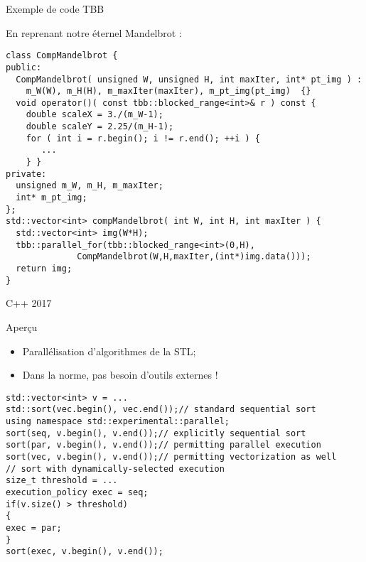 \documentclass[handout,francais]{beamer}
\begin{document}
\begin{frame}[fragile]{Exemple de code TBB}
 
 En reprenant notre éternel Mandelbrot :

\begin{lstlisting}
class CompMandelbrot {
public:
  CompMandelbrot( unsigned W, unsigned H, int maxIter, int* pt_img ) :
    m_W(W), m_H(H), m_maxIter(maxIter), m_pt_img(pt_img)  {}  
  void operator()( const tbb::blocked_range<int>& r ) const {
    double scaleX = 3./(m_W-1);
    double scaleY = 2.25/(m_H-1);
    for ( int i = r.begin(); i != r.end(); ++i ) {
       ...
    } }
private:
  unsigned m_W, m_H, m_maxIter;
  int* m_pt_img;
};
std::vector<int> compMandelbrot( int W, int H, int maxIter ) {
  std::vector<int> img(W*H);
  tbb::parallel_for(tbb::blocked_range<int>(0,H), 
              CompMandelbrot(W,H,maxIter,(int*)img.data()));
  return img;
} 
\end{lstlisting}

\end{frame}

\begin{frame}[fragile]{C++ 2017}
 \begin{block}{Aperçu}
  \begin{itemize}
   \item Parallélisation d'algorithmes de la STL;
   \item Dans la norme, pas besoin d'outils externes !
  \end{itemize}

 \end{block}

\begin{lstlisting}
std::vector<int> v = ...
std::sort(vec.begin(), vec.end());// standard sequential sort
using namespace std::experimental::parallel;
sort(seq, v.begin(), v.end());// explicitly sequential sort
sort(par, v.begin(), v.end());// permitting parallel execution
sort(vec, v.begin(), v.end());// permitting vectorization as well
// sort with dynamically-selected execution
size_t threshold = ...
execution_policy exec = seq;
if(v.size() > threshold)
{
exec = par;
}
sort(exec, v.begin(), v.end());
\end{lstlisting}
\end{frame}
\end{document}
